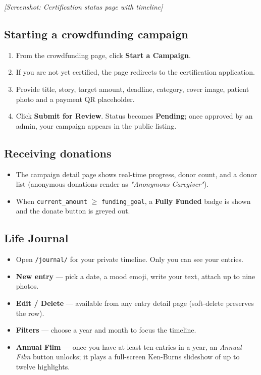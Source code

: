 \textit{[Screenshot: Certification status page with timeline]}

\subsection{Starting a crowdfunding campaign}
\begin{enumerate}
  \item From the crowdfunding page, click \textbf{Start a Campaign}.
  \item If you are not yet certified, the page redirects to the
        certification application.
  \item Provide title, story, target amount, deadline, category,
        cover image, patient photo and a payment QR placeholder.
  \item Click \textbf{Submit for Review}. Status becomes \textbf{Pending};
        once approved by an admin, your campaign appears in the public
        listing.
\end{enumerate}

\subsection{Receiving donations}
\begin{itemize}
  \item The campaign detail page shows real-time progress, donor count,
        and a donor list (anonymous donations render as \emph{"Anonymous
        Caregiver"}).
  \item When \texttt{current\_amount} $\geq$ \texttt{funding\_goal}, a
        \textbf{Fully Funded} badge is shown and the donate button is
        greyed out.
\end{itemize}

\subsection{Life Journal}
\begin{itemize}
  \item Open \texttt{/journal/} for your private timeline. Only you can
        see your entries.
  \item \textbf{New entry} — pick a date, a mood emoji, write your
        text, attach up to nine photos.
  \item \textbf{Edit / Delete} — available from any entry detail page
        (soft-delete preserves the row).
  \item \textbf{Filters} — choose a year and month to focus the
        timeline.
  \item \textbf{Annual Film} — once you have at least ten entries in a
        year, an \emph{Annual Film} button unlocks; it plays a
        full-screen Ken-Burns slideshow of up to twelve highlights.
\end{itemize}


